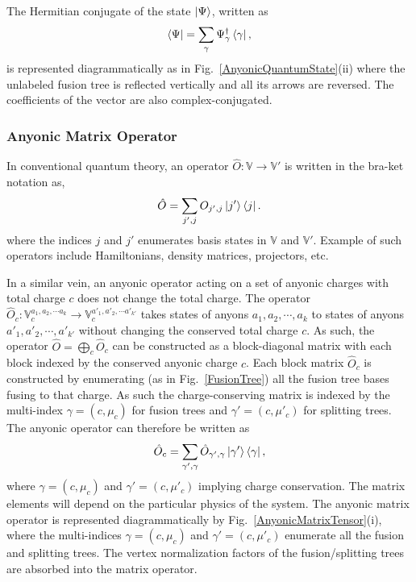 \documentclass[aps,reprint,superscriptaddress,amsmath,amssymb,amsfonts,prb]{revtex4-1}
\begin{document}
The Hermitian conjugate of the state $\ket{\Psi}$, written as 
\begin{equation}
 \bra{\Psi} = \sum_{\gamma} \Psi_{\gamma}^{\dagger} \bra{\gamma} ,
\end{equation}
is represented diagrammatically as in Fig.~\ref{AnyonicQuantumState}(ii) where the unlabeled fusion tree is reflected vertically and all its arrows are reversed. The coefficients of the vector are also complex-conjugated. 


\subsubsection{Anyonic Matrix Operator}
In conventional quantum theory, an operator $\hat{O} : \mathbb{V} \rightarrow \mathbb{V}'$ is written in the bra-ket notation as,
\begin{equation}
 \hat{O} = \sum_{j',j} O_{j', j} \ket{j'} \bra{j} .
\end{equation}
where the indices $j$ and $j'$ enumerates basis states in $\mathbb{V}$ and $\mathbb{V}'$.  Example of such operators include Hamiltonians, density matrices, projectors, etc.

In a similar vein, an anyonic operator acting on a set of anyonic charges with total charge $c$ does not change the total charge.  The operator $\hat{O}_c : \mathbb{V}^{a_1, a_2, \cdots a_k}_c \rightarrow \mathbb{V}^{a'_1, a'_2, \cdots a'_{k'}}_c$ takes states of anyons $a_1, a_2, \cdots, a_k$ to states of anyons $a'_1, a'_2, \cdots, a'_{k'}$ without changing the conserved total charge $c$. As such, the operator $\hat{O}=\bigoplus_c \hat{O}_c$ can be constructed as a block-diagonal matrix with each block indexed by the conserved anyonic charge $c$. Each block matrix $\hat{O}_c$ is constructed by enumerating (as in Fig.~\ref{FusionTree}) all the fusion tree bases fusing to that charge. As such the charge-conserving matrix is indexed by the multi-index $\gamma=(c, \mu_c)$ for fusion trees and  $\gamma'=(c, \mu'_c)$ for splitting trees. The anyonic operator can therefore be written as
\begin{equation}
 \hat{O}_c = \sum_{\gamma', \gamma} \hat{O}_{\gamma', \gamma} \ket{\gamma'}\bra{\gamma} ,
\end{equation}
where $\gamma=(c, \mu_c)$ and $\gamma' = (c,\mu'_c)$ implying charge conservation. 
The matrix elements will depend on the particular physics of the system. The anyonic matrix operator is represented diagrammatically by Fig.~\ref{AnyonicMatrixTensor}(i), where the multi-indices $\gamma=(c, \mu_c)$ and $\gamma'=(c, \mu'_c)$ enumerate all the fusion and splitting trees. The vertex normalization factors of the fusion/splitting trees are absorbed into the matrix operator. 
\end{document}
